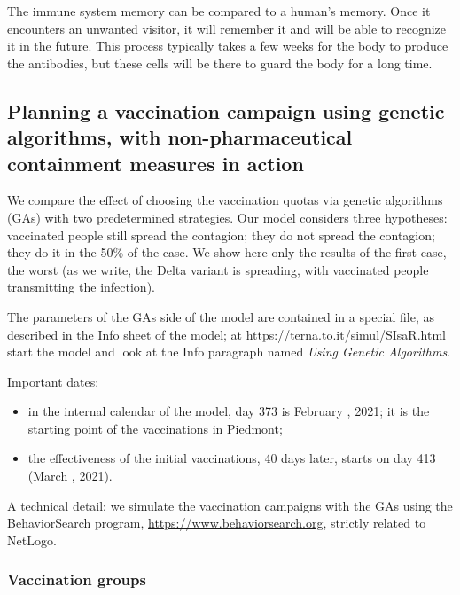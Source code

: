 \documentclass[graybox]{svmult}
\begin{document}
The immune system memory can be compared to a human's memory. Once it encounters an unwanted visitor, it will remember it and will be able to recognize it in the future. This process typically takes a few weeks for the body to produce the antibodies, but these cells will be there to guard the body for a long time.



\subsection{Planning a vaccination campaign using genetic algorithms, with non-pharmaceutical containment measures in action}
\label{planGA}

We compare the effect of choosing the vaccination quotas via genetic algorithms (GAs) with two predetermined strategies. Our model considers three hypotheses: vaccinated people still spread the contagion; they do not spread the contagion; they do it in the 50\% of the case. We show here only the results of the first case, the worst (as we write, the Delta variant is spreading, with vaccinated people transmitting the infection). 

The parameters of the GAs side of the model are contained in a special file, as described in the Info sheet of the model; at  \href{https://terna.to.it/simul/SIsaR.html}{https://terna.to.it/simul/SIsaR.html} start the model and look at the Info paragraph named \emph{Using Genetic Algorithms}.

Important dates: 
\begin{itemize}
\item in the internal calendar of the model, day 373 is February , 2021; it is the starting point of the vaccinations in Piedmont; 

\item the effectiveness of the initial vaccinations, 40 days later, starts on day 413 (March , 2021).
\end{itemize}

A technical detail: we simulate the vaccination campaigns with the GAs using the BehaviorSearch program, \href{https://www.behaviorsearch.org}{https://www.behaviorsearch.org}, strictly related to NetLogo.

\subsubsection{Vaccination groups}
\label{vgroups}
\end{document}
